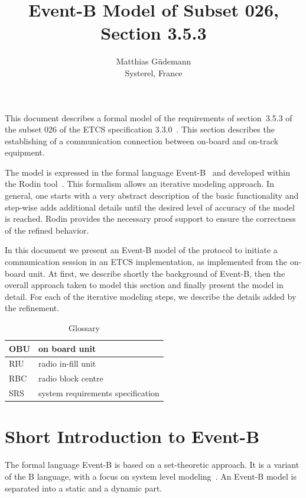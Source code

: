 \documentclass[10pt,a4paper]{article}
\author{Matthias Güdemann\\Systerel, France}
\title{Event-B Model of Subset 026, Section 3.5.3}
\date{}
\begin{document}
\maketitle

This document describes a formal model of the requirements of section~3.5.3 of
the subset 026 of the ETCS specification 3.3.0~\cite{ETCS}. This section
describes the establishing of a communication connection between on-board and
on-track equipment.

The model is expressed in the formal language Event-B~\cite{eventB} and
developed within the Rodin tool~\cite{rodin}. This formalism allows an iterative
modeling approach. In general, one starts with a very abstract description of
the basic functionality and step-wise adds additional details until the desired
level of accuracy of the model is reached. Rodin provides the necessary proof
support to ensure the correctness of the refined behavior.

In this document we present an Event-B model of the protocol to initiate a
communication session in an ETCS implementation, as implemented from the
on-board unit. At first, we describe shortly the background of Event-B, then the
overall approach taken to model this section and finally present the model in
detail. For each of the iterative modeling steps, we describe the details added
by the refinement.


\begin{table}[ht]
  \centering
  \begin{tabular}[ht]{|l|l|}
    \hline
    OBU & on board unit \\
    \hline
    RIU & radio in-fill unit \\
    \hline
    RBC & radio block centre \\
    \hline
    SRS & system requirements specification \\
  \end{tabular}
  \caption{Glossary}
  \label{tab:glossary}
\end{table}

\section{Short Introduction to Event-B}
\label{sec:short-intr-event}

The formal language Event-B is based on a set-theoretic approach. It is a
variant of the B language, with a focus on system level
modeling~\cite{eventbbook}. An Event-B model is separated into a static and a
dynamic part.
\end{document}
